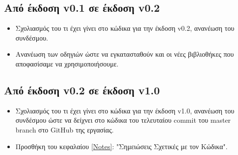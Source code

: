 \documentclass[12pt,a4paper]{article}
\begin{document}
\subsection{Από έκδοση v0.1 σε έκδοση v0.2}
\begin{itemize}
    \item Σχολιασμός του τι έχει γίνει στο κώδικα για την έκδοση v0.2, ανανέωση του συνδέσμου.
    \item Ανανέωση των οδηγιών ώστε να εγκατασταθούν και οι νέες βιβλιοθήκες που αποφασίσαμε να χρησιμοποιήσουμε.
\end{itemize}

\subsection{Από έκδοση v0.2 σε έκδοση v1.0}
\begin{itemize}
    \item Σχολιασμός του τι έχει γίνει στο κώδικα για την έκδοση v1.0, ανανέωση του συνδέσμου ώστε να δείχνει στο κώδικα του τελευταίου commit του master branch στο GitHub της εργασίας.
    \item Προσθήκη του κεφαλαίου \ref{Notes}: "Σημειώσεις Σχετικές με τον Κώδικα".
\end{itemize}
\end{document}
